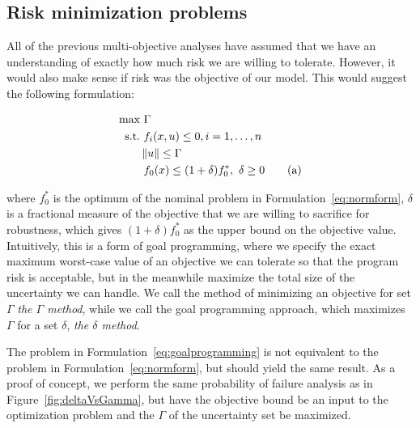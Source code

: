 \subsection{Risk minimization problems}

All of the previous multi-objective analyses have assumed that we have an
understanding of exactly how much risk we are
willing to tolerate. However, it would also make sense if risk was the objective of our
model. This would suggest the following formulation:

\begin{align*}
    \text{max} &~\Gamma \\
    \text{s.t.}     &~f_i(x,u) \leq 0, i = 1,\ldots,n \\
                    & \left\lVert u\right\rVert \leq \Gamma \\
                    &~f_0(x) \leq (1+\delta)f_0^*,~\delta \geq 0 \tag{a}
    \label{eq:goalprogramming}
\end{align*}

where $f_0^*$ is the optimum of the nominal problem in Formulation~\ref{eq:normform}, $\delta$
is a fractional measure of the objective that we are willing to sacrifice for robustness, which
gives $(1+\delta)f_0^*$ as the upper bound on the objective value. Intuitively,
this is a form of goal programming,
where we specify the exact maximum worst-case value of an objective we can tolerate so that the program
risk is acceptable, but in the meanwhile maximize the total size of the uncertainty we can handle.
We call the method of minimizing an objective for set ${\Gamma}$ \emph{the $\Gamma$ method},
while we call the goal programming approach, which maximizes $\Gamma$ for a set $\delta$,
\emph{the $\delta$ method}.

The problem in Formulation~\ref{eq:goalprogramming} is not equivalent to the problem in Formulation~\ref{eq:normform},
but should yield the same result. As a proof of concept, we perform the same probability of failure
analysis as in Figure~\ref{fig:deltaVsGamma}, but have the objective bound be an input to the
optimization problem and the $\Gamma$ of the uncertainty set be maximized.

